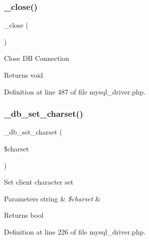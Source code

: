 \subsubsection{\texorpdfstring{\_close()}{\_close()}}
{\footnotesize\ttfamily \+\_\+close (\begin{DoxyParamCaption}{ }\end{DoxyParamCaption})\hspace{0.3cm}{\ttfamily [protected]}}

Close DB Connection

\begin{DoxyReturn}{Returns}
void 
\end{DoxyReturn}


Definition at line 487 of file mysql\+\_\+driver.\+php.

\mbox{\label{class_c_i___d_b__mysql__driver_a2b808d420d8e9fea0b73ad7127f5efb8}} 
\subsubsection{\texorpdfstring{\_db\_set\_charset()}{\_db\_set\_charset()}}
{\footnotesize\ttfamily \+\_\+db\+\_\+set\+\_\+charset (\begin{DoxyParamCaption}\item[{}]{\$charset }\end{DoxyParamCaption})\hspace{0.3cm}{\ttfamily [protected]}}

Set client character set


\begin{DoxyParams}[1]{Parameters}
string & {\em \$charset} & \\
\hline
\end{DoxyParams}
\begin{DoxyReturn}{Returns}
bool 
\end{DoxyReturn}


Definition at line 226 of file mysql\+\_\+driver.\+php.

\mbox{\label{class_c_i___d_b__mysql__driver_af8ef0237bfcdb19215b63fff769e7a55}} 
